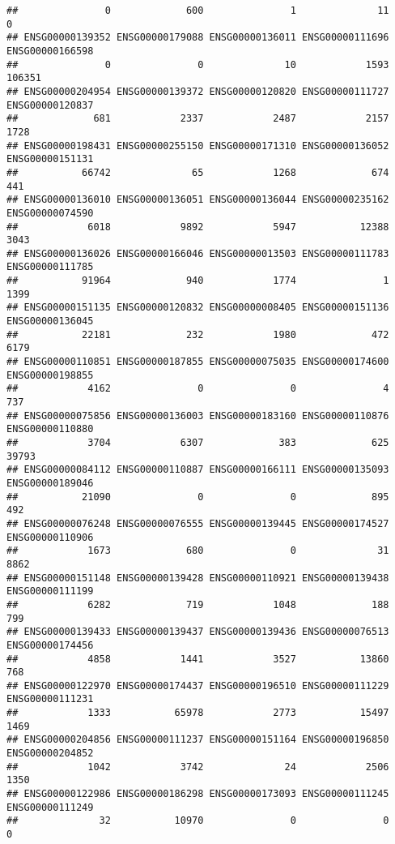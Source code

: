 \documentclass[
]{article}
\begin{document}
\begin{verbatim}
##               0             600               1              11               0 
## ENSG00000139352 ENSG00000179088 ENSG00000136011 ENSG00000111696 ENSG00000166598 
##               0               0              10            1593          106351 
## ENSG00000204954 ENSG00000139372 ENSG00000120820 ENSG00000111727 ENSG00000120837 
##             681            2337            2487            2157            1728 
## ENSG00000198431 ENSG00000255150 ENSG00000171310 ENSG00000136052 ENSG00000151131 
##           66742              65            1268             674             441 
## ENSG00000136010 ENSG00000136051 ENSG00000136044 ENSG00000235162 ENSG00000074590 
##            6018            9892            5947           12388            3043 
## ENSG00000136026 ENSG00000166046 ENSG00000013503 ENSG00000111783 ENSG00000111785 
##           91964             940            1774               1            1399 
## ENSG00000151135 ENSG00000120832 ENSG00000008405 ENSG00000151136 ENSG00000136045 
##           22181             232            1980             472            6179 
## ENSG00000110851 ENSG00000187855 ENSG00000075035 ENSG00000174600 ENSG00000198855 
##            4162               0               0               4             737 
## ENSG00000075856 ENSG00000136003 ENSG00000183160 ENSG00000110876 ENSG00000110880 
##            3704            6307             383             625           39793 
## ENSG00000084112 ENSG00000110887 ENSG00000166111 ENSG00000135093 ENSG00000189046 
##           21090               0               0             895             492 
## ENSG00000076248 ENSG00000076555 ENSG00000139445 ENSG00000174527 ENSG00000110906 
##            1673             680               0              31            8862 
## ENSG00000151148 ENSG00000139428 ENSG00000110921 ENSG00000139438 ENSG00000111199 
##            6282             719            1048             188             799 
## ENSG00000139433 ENSG00000139437 ENSG00000139436 ENSG00000076513 ENSG00000174456 
##            4858            1441            3527           13860             768 
## ENSG00000122970 ENSG00000174437 ENSG00000196510 ENSG00000111229 ENSG00000111231 
##            1333           65978            2773           15497            1469 
## ENSG00000204856 ENSG00000111237 ENSG00000151164 ENSG00000196850 ENSG00000204852 
##            1042            3742              24            2506            1350 
## ENSG00000122986 ENSG00000186298 ENSG00000173093 ENSG00000111245 ENSG00000111249 
##              32           10970               0               0               0 

\end{verbatim}
\end{document}

